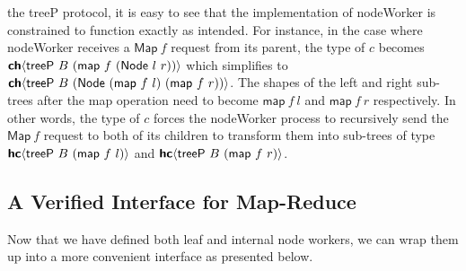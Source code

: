 the \textsf{treeP} protocol, it is easy to see that the implementation of
\textsf{nodeWorker} is constrained to function exactly as intended. For instance,
in the case where \textsf{nodeWorker} receives a $\textsf{Map}\ f$ request from
its parent, the type of $c$ becomes $\CH{\textsf{treeP}\ B\ (\textsf{map}\ f\ (\textsf{Node}\ l\ r))}$
which simplifies to $\CH{\textsf{treeP}\ B\ (\textsf{Node}\ (\textsf{map}\ f\ l)\ (\textsf{map}\ f\ r))}$.
The shapes of the left and right sub-trees after the map operation need to become
$\textsf{map}\ f\ l$ and $\textsf{map}\ f\ r$ respectively. In other words, the
type of $c$ forces the \textsf{nodeWorker} process to recursively send the
$\textsf{Map}\ f$ request to both of its children to transform them into
sub-trees of type $\HC{\textsf{treeP}\ B\ (\textsf{map}\ f\ l)}$ and
$\HC{\textsf{treeP}\ B\ (\textsf{map}\ f\ r)}$.

\subsection{A Verified Interface for Map-Reduce}
Now that we have defined both leaf and internal node workers, we can wrap them
up into a more convenient interface as presented below.

